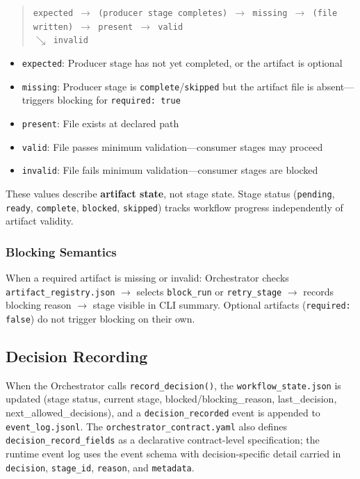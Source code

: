 \documentclass[11pt,a4paper]{article}
\begin{document}
\begin{quote}
\texttt{expected $\rightarrow$ (producer stage completes) $\rightarrow$ missing $\rightarrow$ (file written) $\rightarrow$ present $\rightarrow$ valid}\\
\hspace*{58mm}\texttt{$\searrow$ invalid}
\end{quote}

\begin{itemize}[leftmargin=*,itemsep=1pt]
    \item \texttt{expected}: Producer stage has not yet completed, or the artifact is optional
    \item \texttt{missing}: Producer stage is \texttt{complete}/\texttt{skipped} but the artifact file is absent---triggers blocking for \texttt{required: true}
    \item \texttt{present}: File exists at declared path
    \item \texttt{valid}: File passes minimum validation---consumer stages may proceed
    \item \texttt{invalid}: File fails minimum validation---consumer stages are blocked
\end{itemize}

These values describe \textbf{artifact state}, not stage state. Stage status (\texttt{pending}, \texttt{ready}, \texttt{complete}, \texttt{blocked}, \texttt{skipped}) tracks workflow progress independently of artifact validity.

\subsubsection{Blocking Semantics}

When a required artifact is missing or invalid: Orchestrator checks \texttt{artifact\_registry.json} $\rightarrow$ selects \texttt{block\_run} or \texttt{retry\_stage} $\rightarrow$ records blocking reason $\rightarrow$ stage visible in CLI summary. Optional artifacts (\texttt{required: false}) do not trigger blocking on their own.

\subsection{Decision Recording}

When the Orchestrator calls \texttt{record\_decision()}, the \texttt{workflow\_state.json} is updated (stage status, current stage, blocked/blocking\_reason, last\_decision, next\_allowed\_decisions), and a \texttt{decision\_recorded} event is appended to \texttt{event\_log.jsonl}. The \texttt{orchestrator\_contract.yaml} also defines \texttt{decision\_record\_fields} as a declarative contract-level specification; the runtime event log uses the event schema with decision-specific detail carried in \texttt{decision}, \texttt{stage\_id}, \texttt{reason}, and \texttt{metadata}.
\end{document}
